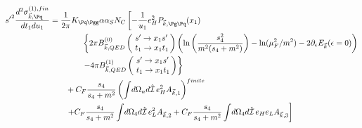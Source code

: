 \begin{align}
{s'}^2\frac{d^2\sigma_{\vec k,\Pq}^{(1),fin}}{dt_1du_1} &=\frac{1}{2\pi}K_{\Pq\Pgg}\alpha\alpha_SN_C\left[-\frac 1 {u_1}e_H^2P_{\vec k,\Pg\Pq}(x_1)\right. \nonumber\\
 &\hspace{40pt}\left\{2\pi B^{(0)}_{\vec k,QED}\left(\!\begin{array}{l}s'\rightarrow x_1s'\\t_1\rightarrow x_1 t_1\end{array}\!\!\right) \left(\ln\left(\frac{s_4^2}{m^2(s_4+m^2)}\right)-\ln(\mu_F^2/m^2)-2\partial_\epsilon E_{\vec k}(\epsilon=0)\right)\right. \nonumber\\
 &\hspace{40pt}\left.-4\pi B^{(1)}_{\vec k,QED}\left(\!\begin{array}{l}s'\rightarrow x_1s'\\t_1\rightarrow x_1 t_1\end{array}\!\!\right)\right\} \nonumber\\
 &\hspace{20pt}+C_F\frac{s_4}{s_4+m^2}\left(\int\!d\Omega_nd\hat{\mathcal I}\,e_H^2A_{\vec k,1}\right)^{finite} \nonumber\\
 &\hspace{20pt}\left.+C_F\frac{s_4}{s_4+m^2}\int\!d\Omega_4d\hat{\mathcal I}\,e_L^2A_{\vec k,2} +C_F\frac{s_4}{s_4+m^2}\int\!d\Omega_4d\hat{\mathcal I}\,e_H e_L A_{\vec k,3} \right]
\end{align}
